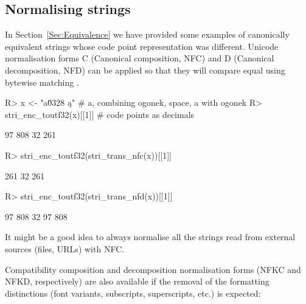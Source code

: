 \documentclass[nojss]{jss}
\begin{document}



%
%
%
%
%
%
%
%
%
%
%
%








\subsection{Normalising strings}\label{Sec:normalisation}

In Section~\ref{Sec:Equivalence} we have provided some examples
of canonically equivalent strings whose code point representation was different.
Unicode normalisation forms C (Canonical composition, NFC) and D
(Canonical decomposition, NFD) can be applied so that they
will compare equal using bytewise matching \citep{usa15:normalization}.

\begin{Schunk}
\begin{Sinput}
R> x <- "a\u0328 ą" # a, combining ogonek, space, a with ogonek
R> stri_enc_toutf32(x)[[1]] # code points as decimals
\end{Sinput}
\begin{Soutput}
[1]  97 808  32 261
\end{Soutput}
\begin{Sinput}
R> stri_enc_toutf32(stri_trans_nfc(x))[[1]]
\end{Sinput}
\begin{Soutput}
[1] 261  32 261
\end{Soutput}
\begin{Sinput}
R> stri_enc_toutf32(stri_trans_nfd(x))[[1]]
\end{Sinput}
\begin{Soutput}
[1]  97 808  32  97 808
\end{Soutput}
\end{Schunk}

It might be a good idea to always normalise all the strings
read from external sources (files, URLs) with NFC.

Compatibility composition and decomposition normalisation forms (NFKC and
NFKD, respectively) are also available if
the removal of the formatting distinctions (font variants,
subscripts, superscripts, etc.) is expected:
\end{document}
